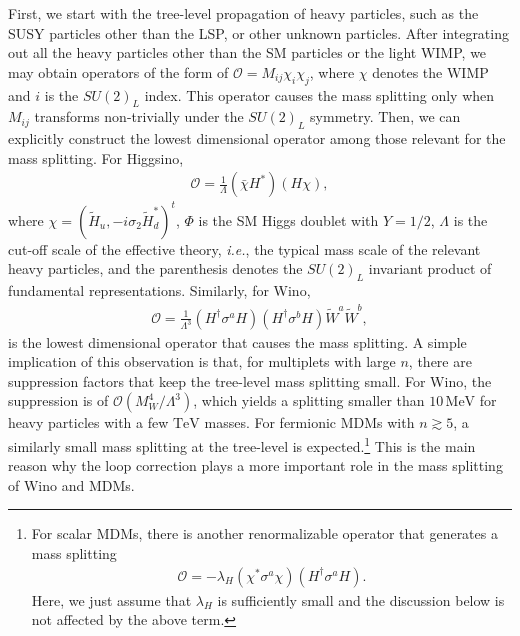 \documentclass[12pt,twoside,book]{article}
\begin{document}
First, we start with the tree-level propagation of heavy particles, such as the SUSY particles other than the LSP, or other unknown particles.
After integrating out all the heavy particles other than the SM particles or the light WIMP, we may obtain operators of the form of $\mathcal{O} = M_{i j} \chi_i \chi_j$, where $\chi$ denotes the WIMP and $i$ is the $SU(2)_L$ index.
This operator causes the mass splitting only when $M_{i j}$ transforms non-trivially under the $SU(2)_L$ symmetry.
Then, we can explicitly construct the lowest dimensional operator among those relevant for the mass splitting.
For Higgsino,
\begin{align}
  \mathcal{O} = \frac{1}{\Lambda} (\bar{\chi} H^{*}) (H \chi),
  \label{eq:Higgsino_mass_splitting}
\end{align}
where $\chi = (\tilde{H}_u, -i \sigma_2 \tilde{H}_d^{*})^t$, $\Phi$ is the SM Higgs doublet with $Y = 1/2$, $\Lambda$ is the cut-off scale of the effective theory, \textit{i.e.}, the typical mass scale of the relevant heavy particles, and the parenthesis denotes the $SU(2)_L$ invariant product of fundamental representations.
Similarly, for Wino, \cite{Gherghetta:1999sw}
\begin{align}
  \mathcal{O} = \frac{1}{\Lambda^3} (H^\dagger \sigma^a H) (H^\dagger \sigma^b H) \tilde{W}^a \tilde{W}^b,
  \label{eq:Wino_mass_splitting}
\end{align}
is the lowest dimensional operator that causes the mass splitting.
A simple implication of this observation is that, for multiplets with large $n$, there are suppression factors that keep the tree-level mass splitting small.
For Wino, the suppression is of $\mathcal{O} (M_W^4 / \Lambda^3)$, which yields a splitting smaller than $10\,\mathrm{MeV}$ for heavy particles with a few $\mathrm{TeV}$ masses.
For fermionic MDMs with $n \gtrsim 5$, a similarly small mass splitting at the tree-level is expected.\footnote
{
  For scalar MDMs, there is another renormalizable operator that generates a mass splitting
  \begin{align*}
    \mathcal{O} = - \lambda_H \left( \chi^{*} \sigma^a \chi \right) \left( H^\dagger \sigma^a H \right).
  \end{align*}
  Here, we just assume that $\lambda_H$ is sufficiently small and the discussion below is not affected by the above term.
}
This is the main reason why the loop correction plays a more important role in the mass splitting of Wino and MDMs.
\end{document}
